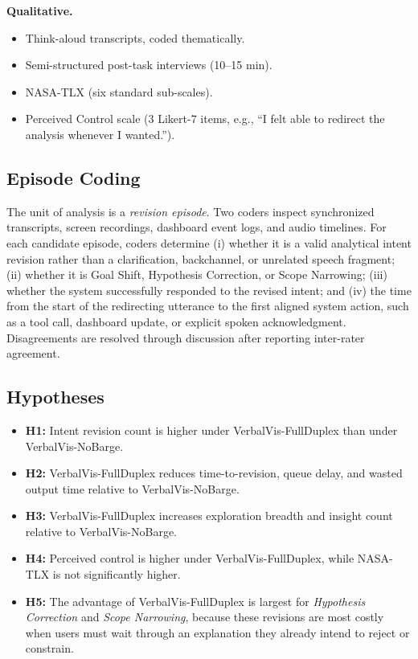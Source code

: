 \documentclass[journal]{IEEEtran}
\begin{document}
\textbf{Qualitative.}
\begin{itemize}
\item Think-aloud transcripts, coded thematically.
\item Semi-structured post-task interviews (10--15 min).
\item NASA-TLX (six standard sub-scales).
\item Perceived Control scale (3 Likert-7 items, e.g., ``I felt able to redirect the analysis whenever I wanted.'').
\end{itemize}

\subsection{Episode Coding}
The unit of analysis is a \emph{revision episode}. Two coders inspect synchronized transcripts, screen recordings, dashboard event logs, and audio timelines. For each candidate episode, coders determine (i) whether it is a valid analytical intent revision rather than a clarification, backchannel, or unrelated speech fragment; (ii) whether it is Goal Shift, Hypothesis Correction, or Scope Narrowing; (iii) whether the system successfully responded to the revised intent; and (iv) the time from the start of the redirecting utterance to the first aligned system action, such as a tool call, dashboard update, or explicit spoken acknowledgment. Disagreements are resolved through discussion after reporting inter-rater agreement.

\subsection{Hypotheses}
\begin{itemize}
\item \textbf{H1:} Intent revision count is higher under VerbalVis-FullDuplex than under VerbalVis-NoBarge.
\item \textbf{H2:} VerbalVis-FullDuplex reduces time-to-revision, queue delay, and wasted output time relative to VerbalVis-NoBarge.
\item \textbf{H3:} VerbalVis-FullDuplex increases exploration breadth and insight count relative to VerbalVis-NoBarge.
\item \textbf{H4:} Perceived control is higher under VerbalVis-FullDuplex, while NASA-TLX is not significantly higher.
\item \textbf{H5:} The advantage of VerbalVis-FullDuplex is largest for \emph{Hypothesis Correction} and \emph{Scope Narrowing}, because these revisions are most costly when users must wait through an explanation they already intend to reject or constrain.
\end{itemize}
\end{document}

